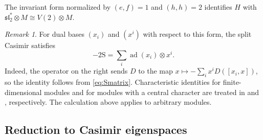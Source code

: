 \documentclass[11pt,reqno]{amsart}
\numberwithin{equation}{section}
\newcommand{\s}{\mathfrak{sl}_2}
\DeclareMathOperator{\ad}{ad}
\theoremstyle{definition}
\theoremstyle{remark}
\newtheorem{remark}[theorem]{Remark}
\begin{document}
The invariant form normalized by \((e,f)=1\) and \((h,h)=2\)
identifies \(H\) with \(\s^*\otimes M\cong V(2)\otimes M\).

\begin{remark}\label{rem:characteristic-identity}
For dual bases \((x_i)\) and \((x^i)\) with respect to this form,
the split Casimir satisfies
\[
-2\mathrm{S}=\sum_i\ad(x_i)\otimes x^i.
\]
Indeed, the operator on the right sends \(D\) to the map
\(x\mapsto-\sum_i x^iD([x_i,x])\), so the identity follows
from \eqref{eq:Smatrix}.
Characteristic identities for finite-dimensional modules and for
modules with a central character are treated in
\cite{BrackenGreen71} and \cite{Kostant75}, respectively.
The calculation above applies to arbitrary modules.
\end{remark}

\subsection{Reduction to Casimir eigenspaces}\label{subsec:rank-one-space}
\end{document}
